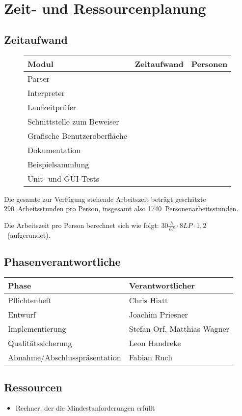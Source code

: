 \section{Zeit- und Ressourcenplanung}%

\subsection{Zeitaufwand}%

\begin{figure}[H]
  \begin{tabular}{| l | l | l | }
    \hline
    \textbf{Modul} & \textbf{Zeitaufwand} & \textbf{Personen} \\ \hline
    Parser &  &  \\ \hline
    Interpreter &  &  \\ \hline
    Laufzeitprüfer &  &  \\ \hline
    Schnittstelle zum Beweiser &  &  \\ \hline
    Grafische Benutzeroberfläche &  &  \\ \hline
    Dokumentation &  &  \\ \hline
    Beispielsammlung &  &  \\ \hline
    Unit- und GUI-Tests &  &  \\ \hline
  \end{tabular}
\end{figure}

Die gesamte zur Verfügung stehende Arbeitszeit beträgt geschätzte 290~Arbeitsstunden pro Person, insgesamt also 1740~Personenarbeitsstunden.

Die Arbeitszeit pro Person berechnet sich wie folgt: $30\frac{h}{LP} \cdot 8LP \cdot 1,2$~(aufgerundet).

\subsection{Phasenverantwortliche}%

  \begin{tabular}{| l | l | }
    \hline
    \textbf{Phase} & \textbf{Verantwortlicher} \\ \hline
    Pflichtenheft & Chris Hiatt \\ \hline
    Entwurf & Joachim Priesner \\ \hline
    Implementierung & Stefan Orf, Matthias Wagner \\ \hline
    Qualitätssicherung & Leon Handreke \\ \hline
    Abnahme/Abschlusspräsentation & Fabian Ruch \\ \hline
  \end{tabular}

\subsection{Ressourcen}%

\begin{itemize}%
    \item Rechner, der die Mindestanforderungen erfüllt
\end{itemize}%
